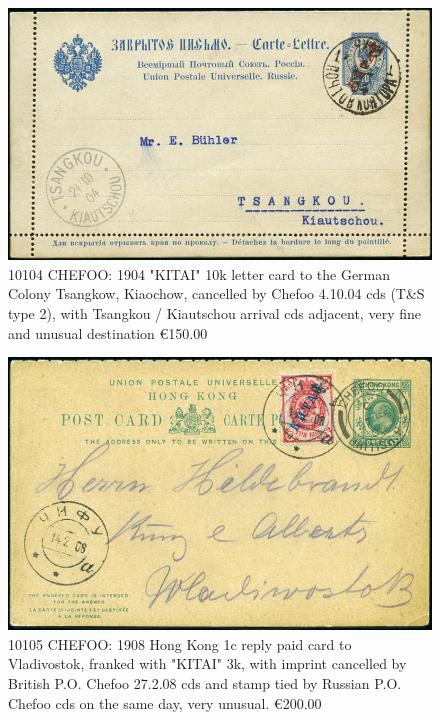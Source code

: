 \begin{figure}[htbp]
\centering
\includegraphics[width=.95\textwidth]{../russian-post-offices-in-china/10104.jpg}
\caption{
10104	CHEFOO: 1904 "KITAI" 10k letter card to the German Colony Tsangkow, 
Kiaochow, cancelled by Chefoo 4.10.04 cds (T\&S type 2), with 
Tsangkou / Kiautschou arrival cds adjacent, very fine and unusual destination
\euro 150.00
}  
\end{figure} 



\begin{figure}[htbp]
\centering
\includegraphics[width=.95\textwidth]{../russian-post-offices-in-china/10105.jpg}
\caption{
10105	CHEFOO: 1908 Hong Kong 1c reply paid card to Vladivostok, 
franked with "KITAI" 3k, with imprint cancelled by British P.O. 
Chefoo 27.2.08 cds and stamp tied by Russian P.O. Chefoo cds on the same 
day, very unusual.
\euro 200.00
}  
\end{figure} 

